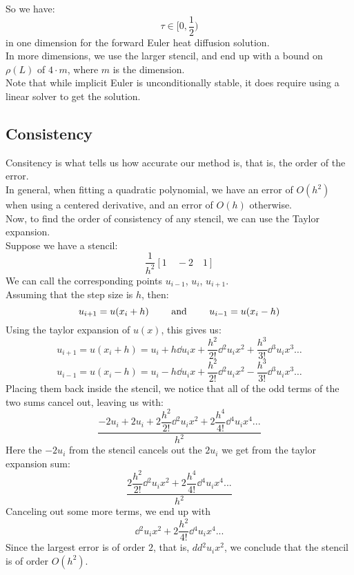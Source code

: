 \documentclass[12pt]{article}
\begin{document}
So we have:
\[ \tau \in \Big[0, \dfrac{1}{2}\Big) \]
in one dimension for the forward Euler heat
diffusion solution. \\

In more dimensions, we use the larger stencil, and
end up with a bound on $\rho(L)$ of $4 \cdot m$,
where $m$ is the dimension. \\

Note that while implicit Euler is unconditionally
stable, it does require using a linear solver to get
the solution. \\

\newpage

\subsection*{Consistency}

Consitency is what tells us how accurate our method is,
that is, the order of the error. \\

In general, when fitting a quadratic polynomial, 
we have an error of $O(h^2)$ when using a centered
derivative, and an error of $O(h)$ otherwise. \\

Now, to find the order of consistency of any stencil,
we can use the Taylor expansion. \\

Suppose we have a stencil:
\[ \dfrac{1}{h^2}[1 \quad -2 \quad 1] \]
We can call the corresponding points 
$u_{i-1}$, $u_i$, $u_{i+1}$. \\
Assuming that the step size is $h$, then:
\[ u_{i+1} = u(x_i + h) \qquad \text{ and } \qquad 
u_{i-1} = u(x_i - h) \]
Using the taylor expansion of $u(x)$, this gives us:
\[ u_{i+1} = u(x_i + h) = u_i + h \dd{u_i}{x}
+ \dfrac{h^2}{2!} \dd{^2u_i}{x^2} 
+ \dfrac{h^3}{3!} \dd{^3u_i}{x^3} \dots \]
\[ u_{i-1} = u(x_i - h) = u_i - h \dd{u_i}{x}
+ \dfrac{h^2}{2!} \dd{^2u_i}{x^2} 
- \dfrac{h^3}{3!} \dd{^3u_i}{x^3} \dots \]
Placing them back inside the stencil, we notice 
that all of the odd terms of the two sums cancel out,
leaving us with:
\[ \dfrac{-2u_i + 2u_i + 2\dfrac{h^2}{2!}\dd{^2u_i}{x^2}
+ 2\dfrac{h^4}{4!}\dd{^4u_i}{x^4} ...}{h^2} \]
Here the $-2u_i$ from the stencil cancels out the
$2u_i$ we get from the taylor expansion sum:
\[ \dfrac{2\dfrac{h^2}{2!}\dd{^2u_i}{x^2}
+ 2\dfrac{h^4}{4!}\dd{^4u_i}{x^4} ...}{h^2} \]
Canceling out some more terms, we end up with
\[ \dd{^2u_i}{x^2} + 2\dfrac{h^2}{4!}\dd{^4u_i}{x^4} ... \]
Since the largest error is of order $2$,
that is, $dd{^2u_i}{x^2}$, we conclude that the
stencil is of order $O(h^2)$. \\
\end{document}
